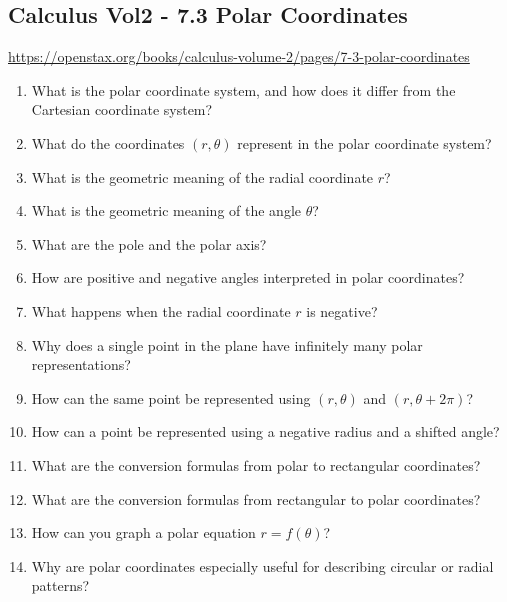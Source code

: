 \subsection{Calculus Vol2 - 7.3 Polar Coordinates}

\url{https://openstax.org/books/calculus-volume-2/pages/7-3-polar-coordinates}

\begin{enumerate}

\item What is the polar coordinate system, and how does it differ from the Cartesian coordinate system?

\item What do the coordinates $(r,\theta)$ represent in the polar coordinate system?

\item What is the geometric meaning of the radial coordinate $r$?

\item What is the geometric meaning of the angle $\theta$?

\item What are the pole and the polar axis?

\item How are positive and negative angles interpreted in polar coordinates?

\item What happens when the radial coordinate $r$ is negative?

\item Why does a single point in the plane have infinitely many polar representations?

\item How can the same point be represented using $(r,\theta)$ and $(r,\theta + 2\pi)$?

\item How can a point be represented using a negative radius and a shifted angle?

\item What are the conversion formulas from polar to rectangular coordinates?

\item What are the conversion formulas from rectangular to polar coordinates?

\item How can you graph a polar equation $r = f(\theta)$?

\item Why are polar coordinates especially useful for describing circular or radial patterns?


\end{enumerate}
